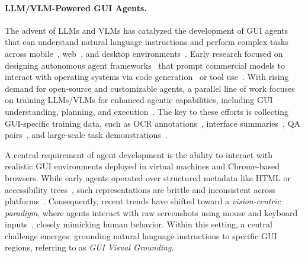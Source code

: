 \paragraph{LLM/VLM-Powered GUI Agents.}
The advent of LLMs and VLMs has catalyzed the development of GUI agents that can understand natural language instructions and perform complex tasks across mobile~\citep{rawles2024androidworld}, web~\citep{zhou2023webarena, deng2023mind2web}, and desktop environments~\citep{xie2024osworld, zhang2024ufo, zhang2025ufo2}.
Early research focused on designing autonomous agent frameworks~\citep{zheng2024gpt, wu2024copilot, jia2024agentstore} that prompt commercial models to interact with operating systems via code generation~\citep{sun2024survey, sun2025scienceboard} or tool use~\citep{zhang2025appagent,zhang2025api}.
With rising demand for open-source and customizable agents, a parallel line of work focuses on training LLMs/VLMs for enhanced agentic capabilities, including GUI understanding, planning, and execution~\citep{xu2024aguvis, qin2025ui, chen2024guicourse, chai2024amex}. The key to these efforts is collecting GUI-specific training data, such as OCR annotations~\citep{lu2024gui}, interface summaries~\citep{you2024ferret}, QA pairs~\citep{chen2024guicourse}, and large-scale task demonstrations~\citep{deng2023mind2web, rawles2023androidinthewild, zhang2024android, zheng2025vem, sun2024genesis, cheng2024vision, zhang2025breaking}.

A central requirement of agent development is the ability to interact with realistic GUI environments deployed in virtual machines and Chrome-based browsers.
While early agents operated over structured metadata like HTML or accessibility trees~\citep{zhou2023webarena, he2024webvoyager}, such representations are brittle and inconsistent across platforms~\citep{cheng2024seeclick, xu2024aguvis}. Consequently, recent trends have shifted toward a \emph{vision-centric paradigm}, where agents interact with raw screenshots using mouse and keyboard inputs~\citep{openai2025operator, anthropic2024cuda}, closely mimicking human behavior. Within this setting, a central challenge emerges: grounding natural language instructions to specific GUI regions, referring to as \textit{GUI Visual Grounding}.

